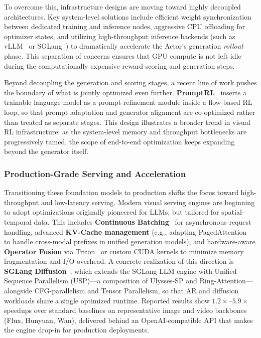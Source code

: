\documentclass{llmxive}
\begin{document}
To overcome this, infrastructure designs are moving toward highly decoupled architectures. Key system-level solutions include efficient weight synchronization between dedicated training and inference nodes, aggressive CPU offloading for optimizer states, and utilizing high-throughput inference backends (such as vLLM~\citep{kwon2023efficient} or SGLang~\citep{zheng2024sglang}) to dramatically accelerate the Actor's generation \emph{rollout} phase. This separation of concerns ensures that GPU compute is not left idle during the computationally expensive reward-scoring and generation steps.

Beyond decoupling the generation and scoring stages, a recent line of work pushes the boundary of what is jointly optimized even further. \textbf{PromptRL}~\citep{wang2026promptrl} inserts a trainable language model as a prompt-refinement module inside a flow-based RL loop, so that prompt adaptation and generator alignment are co-optimized rather than treated as separate stages. This design illustrates a broader trend in visual RL infrastructure: as the system-level memory and throughput bottlenecks are progressively tamed, the scope of end-to-end optimization keeps expanding beyond the generator itself.

\subsubsection{Production-Grade Serving and Acceleration}
\label{subsubsec:infra_serving}
Transitioning these foundation models to production shifts the focus toward high-throughput and low-latency serving. Modern visual serving engines are beginning to adopt optimizations originally pioneered for LLMs, but tailored for spatial-temporal data. This includes \textbf{Continuous Batching}~\citep{yu2022orca} for asynchronous request handling, advanced \textbf{KV-Cache management} (e.g., adapting PagedAttention~\citep{kwon2023efficient} to handle cross-modal prefixes in unified generation models), and hardware-aware \textbf{Operator Fusion} via Triton~\citep{tillet2019triton} or custom CUDA kernels to minimize memory fragmentation and I/O overhead. A concrete realization of this direction is \textbf{SGLang Diffusion}~\citep{sglang-diffusion-2026}, which extends the SGLang LLM engine with Unified Sequence Parallelism (USP)---a composition of Ulysses-SP and Ring-Attention---alongside CFG-parallelism and Tensor Parallelism, so that AR and diffusion workloads share a single optimized runtime. Reported results show $1.2\times$--$5.9\times$ speedups over standard baselines on representative image and video backbones (Flux, Hunyuan, Wan), delivered behind an OpenAI-compatible API that makes the engine drop-in for production deployments.
\end{document}
